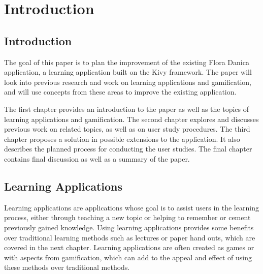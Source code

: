 
\chapter{Introduction}

\label{Chapter1}



\section{Introduction}

The goal of this paper is to plan the improvement of the existing Flora Danica application, a learning application built on the Kivy framework. The paper will look into previous research and work on learning applications and gamification, and will use concepts from these areas to improve the existing application.

The first chapter provides an introduction to the paper as well as the topics of learning applications and gamification. The second chapter explores and discusses previous work on related topics, as well as on user study procedures. The third chapter proposes a solution in possible extensions to the application. It also describes the planned process for conducting the user studies. The final chapter contains final discussion as well as a summary of the paper.


\section{Learning Applications}

Learning applications are applications whose goal is to assist users in the learning process, either through teaching a new topic or helping to remember or cement previously gained knowledge. Using learning applications provides some benefits over traditional learning methods such as lectures or paper hand outs, which are covered in the next chapter. Learning applications are often created as games or with aspects from gamification, which can add to the appeal and effect of using these methods over traditional methods.

